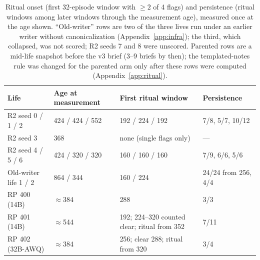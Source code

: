 \documentclass{article}
\begin{document}
\begin{table}[h]
\centering
\small
\caption{Ritual onset (first 32-episode window with $\ge 2$ of 4 flags) and persistence (ritual windows among later windows through the measurement age), measured once at the age shown. ``Old-writer'' rows are two of the three lives run under an earlier writer without canonicalization (Appendix~\ref{app:infra}); the third, which collapsed, was not scored; R2 seeds 7 and 8 were unscored. Parented rows are a mid-life snapshot before the v3 brief (3--9 briefs by then); the templated-notes rule was changed for the parented arm only after these rows were computed (Appendix~\ref{app:ritual}).}
\label{tab:ritual}
\footnotesize
\setlength{\tabcolsep}{4pt}
\begin{tabular}{llp{4.2cm}l}
\toprule
Life & Age at measurement & First ritual window & Persistence \\
\midrule
R2 seed 0 / 1 / 2 & 424 / 424 / 552 & 192 / 224 / 192 & 7/8, 5/7, 10/12 \\
R2 seed 3 & 368 & none (single flags only) & --- \\
R2 seed 4 / 5 / 6 & 424 / 320 / 320 & 160 / 160 / 160 & 7/9, 6/6, 5/6 \\
Old-writer life 1 / 2 & 864 / 344 & 160 / 224 & 24/24 from 256, 4/4 \\
\midrule
RP 400 (14B) & $\approx$384 & 288 & 3/3 \\
RP 401 (14B) & $\approx$544 & 192; 224--320 counted clear; ritual from 352 & 7/11 \\
RP 402 (32B-AWQ) & $\approx$384 & 256; clear 288; ritual from 320 & 3/4 \\
\bottomrule
\end{tabular}
\end{table}
\end{document}
